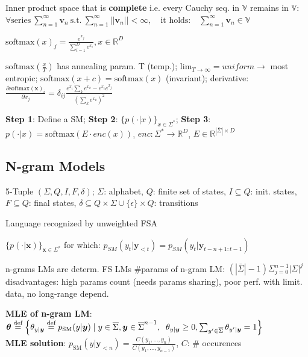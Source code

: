  Inner product space that is \textbf{complete} i.e. every Cauchy seq. in \(\mathbb{V}\) remains in \(\mathbb{V}\):\\

$\forall \text{series} \ \sum_{n=1}^\infty\textbf{v}_n \ \text{s.t.} \ \sum_{n=1}^\infty||\textbf{v}_n||<\infty, \quad
\text{it holds:} \quad \sum_{n=1}^\infty\textbf{v}_n \in \mathbb{V}
$


$\text{softmax}(x)_j = \frac{e^{x_j}}{\sum_{i=1}^De^{x_i}}, x\in\mathbb{R}^D$

\comment \(\text{softmax}(\frac{x}{T})\) has annealing param. T (temp.); \(\text{lim}_{T\rightarrow\infty} = uniform \rightarrow\)  most entropic; \(\text{softmax}(x+c) = \text{softmax}(x)\) (invariant); derivative:\\
$\frac{\partial \text{softmax}(\mathbf{x})_i}{\partial x_j} = \delta_{ij}  \frac{e^{x_i}\sum_k e^{x_k} - e^{x_i} e^{x_j}}{\left(\sum_k e^{x_k}\right)^2}
$

\textbf{Step 1}: Define a SM; \textbf{Step 2}: \(\{p(\cdot|x)\}_{x\in\Sigma^*}\); \textbf{Step 3}: \(p(\cdot|x)=\text{softmax}(E\cdot enc(x))\), \(enc:\Sigma^*\to \mathbb{R}^D\), \(E \in \mathbb{R}^{|\bar{\Sigma}|\times D}\)

\subsection{N-gram Models}
 5-Tuple \((\Sigma, Q, I, F, \delta)\); \(\Sigma\): alphabet, \(Q\): finite set of states, \(I\subseteq Q\): init. states, \(F\subseteq Q\): final states, \(\delta\subseteq Q\times\Sigma\cup\{\epsilon\}\times Q\): transitions

 Language recognized by unweighted FSA

 \(\{p(\cdot|\textbf{x})\}_{\textbf{x}\in\Sigma^*}\) for which:
$p_{SM}(y_t|\mathbf{y}_{<t}) = p_{SM}(y_t|\mathbf{y}_{t-n+1:t-1})$

\comment n-grams LMs are determ. FS LMs 
\comment \#params of n-gram LM: \((|\bar{\Sigma}|-1)\Sigma_{j=0}^{n-1}|\Sigma|^j\)
\comment disadvantages: high params count (needs params sharing), poor perf. with limit. data, no long-range depend.

\textbf{MLE of n-gram LM}:
\(
\boldsymbol{\theta} \stackrel{\text{def}}{=} \left\{ \theta_{y|\boldsymbol{y}} \stackrel{\text{def}}{=} p_{\text{SM}}(y|\boldsymbol{y}) \mid y \in \overline{\Sigma}, \boldsymbol{y} \in \overline{\Sigma}^{n-1}, \right. \\
\left. \theta_{y|\boldsymbol{y}} \ge 0, \sum_{y' \in \overline{\Sigma}} \theta_{y'|\boldsymbol{y}} = 1 \right\}
\) \\
\textbf{MLE solution}: \(p_{\text{SM}}(y|\boldsymbol{y}_{<n}) = \frac{C(y_1, \dots, y_n)}{C(y_1, \dots, y_{n-1})}\), \(C\): \# occurences

